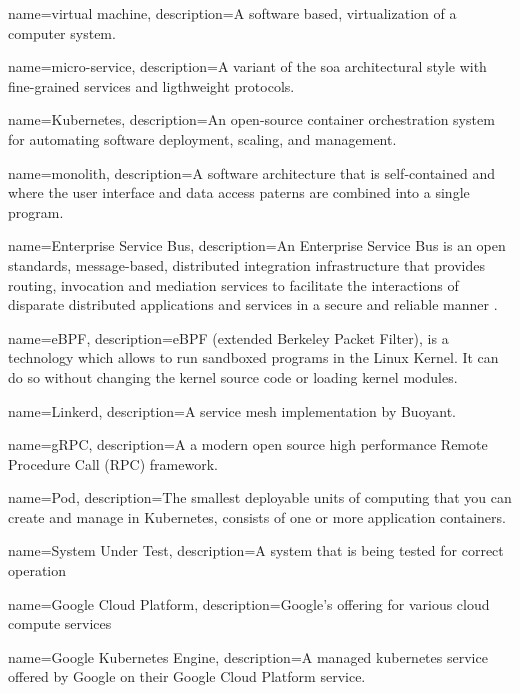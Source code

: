{
    name={virtual machine},
    description={A software based, virtualization of a computer system.}
}

{
    name={micro-service},
    description={A variant of the \gls{soa} architectural style with fine-grained services and ligthweight protocols.}
}

{
    name={Kubernetes},
    description={An open-source \gls{container} orchestration system for automating software deployment, scaling, and management.}
}

{
    name={monolith},
    description={A software architecture that is self-contained and where the user interface and data access paterns are combined into a single program.}
}

{
    name={Enterprise Service Bus},
    description={An Enterprise Service Bus is an open standards, message-based, distributed integration infrastructure that provides routing, invocation and mediation services to facilitate the interactions of disparate distributed applications and services in a secure and reliable manner \cite{menge2007enterprise}.}
}

{
    name={eBPF},
    description={eBPF (extended Berkeley Packet Filter), is a technology which allows to run sandboxed programs in the Linux Kernel. It can do so without changing the kernel source code or loading kernel modules.}
}

{
    name={Linkerd},
    description={A service mesh implementation by Buoyant.}
}

{
    name={gRPC},
    description={A a modern open source high performance Remote Procedure Call (RPC) framework.}
}

{
    name={Pod},
    description={The smallest deployable units of computing that you can create and manage in Kubernetes, consists of one or more application containers.}
}

{
    name={System Under Test},
    description={A system that is being tested for correct operation}
}

{
    name={Google Cloud Platform},
    description={Google's offering for various cloud compute services}
}

{
    name={Google Kubernetes Engine},
    description={A managed kubernetes service offered by Google on their Google Cloud Platform service.}
}




